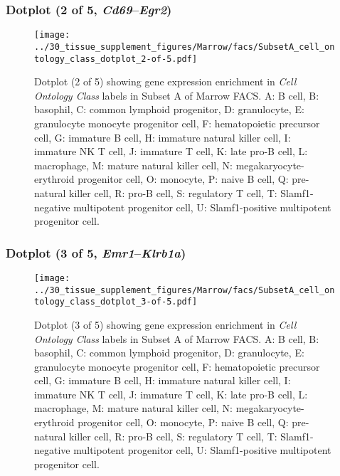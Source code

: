 \subsubsection{Dotplot (2 of 5, \emph{Cd69}--\emph{Egr2})}
\begin{figure}[h]
\centering
\texttt{[image: ../30\_tissue\_supplement\_figures/Marrow/facs/SubsetA\_cell\_ontology\_class\_dotplot\_2-of-5.pdf]}

\caption{ Dotplot (2 of 5)  showing gene expression enrichment in \emph{Cell Ontology Class} labels in Subset A of Marrow FACS. A: B cell, B: basophil, C: common lymphoid progenitor, D: granulocyte, E: granulocyte monocyte progenitor cell, F: hematopoietic precursor cell, G: immature B cell, H: immature natural killer cell, I: immature NK T cell, J: immature T cell, K: late pro-B cell, L: macrophage, M: mature natural killer cell, N: megakaryocyte-erythroid progenitor cell, O: monocyte, P: naive B cell, Q: pre-natural killer cell, R: pro-B cell, S: regulatory T cell, T: Slamf1-negative multipotent progenitor cell, U: Slamf1-positive multipotent progenitor cell.}
\end{figure}


\clearpage

\subsubsection{Dotplot (3 of 5, \emph{Emr1}--\emph{Klrb1a})}
\begin{figure}[h]
\centering
\texttt{[image: ../30\_tissue\_supplement\_figures/Marrow/facs/SubsetA\_cell\_ontology\_class\_dotplot\_3-of-5.pdf]}

\caption{ Dotplot (3 of 5)  showing gene expression enrichment in \emph{Cell Ontology Class} labels in Subset A of Marrow FACS. A: B cell, B: basophil, C: common lymphoid progenitor, D: granulocyte, E: granulocyte monocyte progenitor cell, F: hematopoietic precursor cell, G: immature B cell, H: immature natural killer cell, I: immature NK T cell, J: immature T cell, K: late pro-B cell, L: macrophage, M: mature natural killer cell, N: megakaryocyte-erythroid progenitor cell, O: monocyte, P: naive B cell, Q: pre-natural killer cell, R: pro-B cell, S: regulatory T cell, T: Slamf1-negative multipotent progenitor cell, U: Slamf1-positive multipotent progenitor cell.}
\end{figure}


\clearpage

